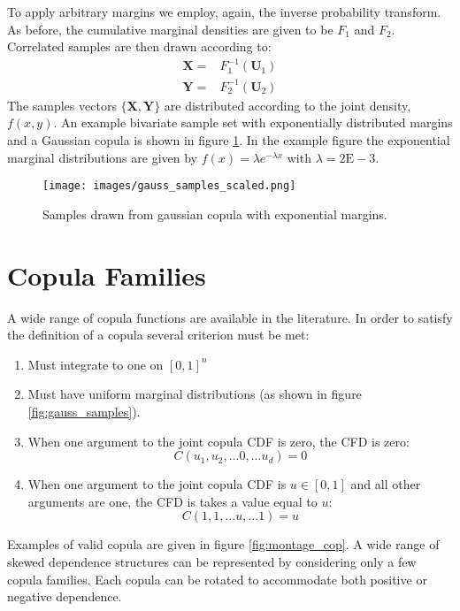 To apply arbitrary margins we employ, again, the inverse probability transform.  As before, the cumulative marginal densities are given to be $F_1$ and $F_2$.
Correlated samples are then drawn according to:
\begin{eqnarray}
\mathbf X = & F_1^{-1}(\mathbf U_1) \\
\mathbf Y = & F_2^{-1}(\mathbf U_2)
\end{eqnarray}
The samples vectors $\{\mathbf X, \mathbf Y\}$ are distributed according to the joint density, $f(x,y)$.  An example bivariate sample set with exponentially distributed margins and a Gaussian copula is shown in figure \ref{fig:gauss_samples_scaled}.  In the example figure the exponential marginal distributions are given by $f(x)=\lambda e^{-\lambda x}$ with $\lambda=2\mathrm{E-}3$.

\begin{figure}[!htbp]
\centering
\texttt{[image: images/gauss\_samples\_scaled.png]}
\caption{Samples drawn from gaussian copula with exponential margins.}
\label{fig:gauss_samples_scaled}
\end{figure}


\section*{Copula Families}

A wide range of copula functions are available in the literature.  In order to satisfy the definition of a copula several criterion must be met:
\begin{enumerate}
\item Must integrate to one on $[0, 1]^n$
\item Must have uniform marginal distributions (as shown in figure \ref{fig:gauss_samples}).
\item When one argument to the joint copula CDF is zero, the CFD is zero:
\begin{equation}
C(u_1, u_2, ... 0, ... u_d) = 0
\end{equation}
\item When one argument to the joint copula CDF is $u\in[0,1]$ and all other arguments are one, the CFD is takes a value equal to $u$:
\begin{equation}
C(1, 1, ... u, ... 1) = u
\end{equation}
\end{enumerate}

Examples of valid copula are given in figure \ref{fig:montage_cop}.  A wide range of skewed dependence structures can be represented by considering only a few copula families.  Each copula can be rotated to accommodate both positive or negative dependence.

